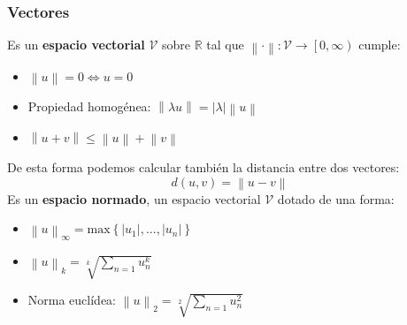\subsubsection{Vectores}
Es un \textbf{espacio vectorial} \(\mathcal{V}\) sobre \(\mathbb{R}\) tal que \(\left \| \cdot  \right \|: \mathcal{V} \rightarrow\left [ 0, \infty \right )\) cumple:
\begin{itemize}
        \item \(\left \| u \right \| = 0 \Leftrightarrow  u = 0\)
        \item Propiedad homogénea: \(\left \| \lambda u \right \| = \left | \lambda \right |\left \| u \right \|\)
        \item \(\left \| u + v \right \| \leq  \left \| u \right \| + \left \| v \right \|\)
\end{itemize}
De esta forma podemos calcular también la distancia entre dos vectores:
\[
        d(u,v) = \left \| u - v \right \|
\]
Es un \textbf{espacio normado}, un espacio vectorial \(\mathcal{V}\) dotado de una forma:
\begin{itemize}
        \item \(\left \| u \right \|_{\infty} = \text{max}\left \{ \left | u_1 \right |, ..., \left | u_n \right | \right \} \)
        \item \(\left \| u \right \|_k=\sqrt[k]{\sum_{n=1} u_n^k}\)
        \item Norma euclídea: \(\left \| u \right \|_2=\sqrt[2]{\sum_{n=1} u_n^2}\)
\end{itemize}
